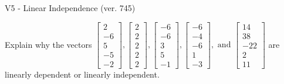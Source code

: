 \begin{exercise}
  \begin{exerciseTitle}V5 - Linear Independence (ver. 745)\end{exerciseTitle}
  \begin{exerciseStatement}
    Explain why the vectors \(\left[\begin{array}{r}
2 \\
-6 \\
5 \\
-5 \\
-2
\end{array}\right] , \left[\begin{array}{r}
2 \\
2 \\
2 \\
2 \\
2
\end{array}\right] , \left[\begin{array}{r}
-6 \\
-6 \\
3 \\
5 \\
-1
\end{array}\right] , \left[\begin{array}{r}
-6 \\
-4 \\
-6 \\
1 \\
-3
\end{array}\right] , \text{ and } \left[\begin{array}{r}
14 \\
38 \\
-22 \\
2 \\
11
\end{array}\right]\) are linearly dependent or linearly independent.	



\end{exerciseStatement}
\end{exercise}

